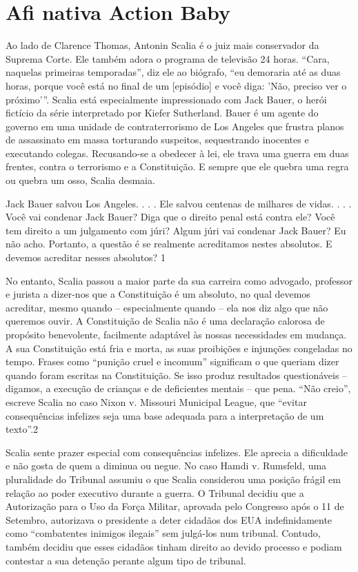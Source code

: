 \chapter{Aﬁ nativa Action Baby}\label{Aﬁ nativa Action Baby}
 \par 
Ao lado de Clarence Thomas, Antonin Scalia é o juiz mais conservador da Suprema Corte. Ele também adora o programa de televisão {\color{blue}24} horas. “Cara, naquelas primeiras temporadas”, diz ele ao biógrafo, “eu demoraria até as duas horas, porque você está no final de um [episódio] e você diga: 'Não, preciso ver o próximo'”. Scalia está especialmente impressionado com Jack Bauer, o herói fictício da série interpretado por Kiefer Sutherland. Bauer é um agente do governo em uma unidade de contraterrorismo de Los Angeles que frustra planos de assassinato em massa torturando suspeitos, sequestrando inocentes e executando colegas. Recusando-se a obedecer à lei, ele trava uma guerra em duas frentes, contra o terrorismo e a Constituição. E sempre que ele quebra uma regra ou quebra um osso, Scalia desmaia.
 \par 
Jack Bauer salvou Los Angeles. . . . Ele salvou centenas de milhares de vidas. . . . Você vai condenar Jack Bauer? Diga que o direito penal está contra ele? Você tem direito a um julgamento com júri? Algum júri vai condenar Jack Bauer? Eu não acho. Portanto, a questão é se realmente acreditamos nestes absolutos. E devemos acreditar nesses absolutos? {\color{blue}1}
 \par 
No entanto, Scalia passou a maior parte da sua carreira como advogado, professor e jurista a dizer-nos que a Constituição é um absoluto, no qual devemos acreditar, mesmo quando – especialmente quando – ela nos diz algo que não queremos ouvir. A Constituição de Scalia não é uma declaração calorosa de propósito benevolente, facilmente adaptável às nossas necessidades em mudança. A sua Constituição está fria e morta, as suas proibições e injunções congeladas no tempo. Frases como “punição cruel e incomum” significam o que queriam dizer quando foram escritas na Constituição. Se isso produz resultados questionáveis ​​– digamos, a execução de crianças e de deficientes mentais – que pena. “Não creio”, escreve Scalia no caso Nixon v. Missouri Municipal League, que “evitar consequências infelizes seja uma base adequada para a interpretação de um texto”.{\color{blue}2}
 \par 
Scalia sente prazer especial com consequências infelizes. Ele aprecia a dificuldade e não gosta de quem a diminua ou negue. No caso Hamdi v. Rumsfeld, uma pluralidade do Tribunal assumiu o que Scalia considerou uma posição frágil em relação ao poder executivo durante a guerra. O Tribunal decidiu que a Autorização para o Uso da Força Militar, aprovada pelo Congresso após o {\color{blue}11} de Setembro, autorizava o presidente a deter cidadãos dos EUA indefinidamente como “combatentes inimigos ilegais” sem julgá-los num tribunal. Contudo, também decidiu que esses cidadãos tinham direito ao devido processo e podiam contestar a sua detenção perante algum tipo de tribunal.
